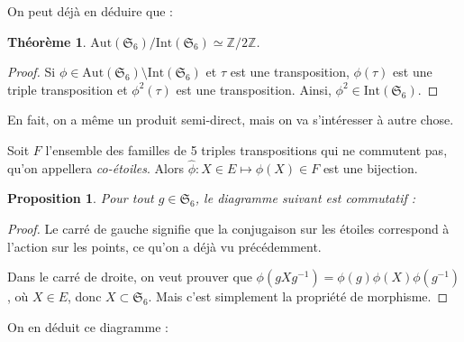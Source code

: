 \documentclass[a4paper, 11pt]{article}
\def\Z{\mathbb{Z}}
\def\Sigmap{\mathfrak{S}}
\newtheorem*{proposition}{Proposition}
\newtheorem*{theorem}{Théorème}
\begin{document}
On peut déjà en déduire que :

\begin{theorem}
  $\mathrm{Aut}(\Sigmap_6)/\mathrm{Int}(\Sigmap_6) \simeq \Z/2\Z$.
\end{theorem}
\begin{proof}
  Si $\phi \in \mathrm{Aut}(\Sigmap_6) \setminus \mathrm{Int}(\Sigmap_6)$ et
  $\tau$ est une transposition, $\phi(\tau)$ est une triple transposition et
  $\phi^2(\tau)$ est une transposition. Ainsi, $\phi^2 \in
  \mathrm{Int}(\Sigmap_6)$.
\end{proof}

En fait, on a même un produit semi-direct, mais on va s'intéresser à autre
chose.

Soit $F$ l'ensemble des familles de 5 triples transpositions qui ne commutent
pas, qu'on appellera \emph{co-étoiles}. Alors $\widehat{\phi} : X \in E \mapsto
\phi(X) \in F$ est une bijection.

\begin{proposition}
  Pour tout $g \in \Sigmap_6$, le diagramme suivant est commutatif :
  \begin{center}
  \end{center}
\end{proposition}
\begin{proof}
  Le carré de gauche signifie que la conjugaison sur les étoiles correspond à
  l'action sur les points, ce qu'on a déjà vu précédemment.
  
  Dans le carré de droite, on veut prouver que $\phi(gXg^{-1}) =
  \phi(g)\phi(X)\phi(g^{-1})$, où $X \in E$, donc $X \subset \Sigmap_6$. Mais
  c'est simplement la propriété de morphisme.
\end{proof}
On en déduit ce diagramme :
\end{document}
